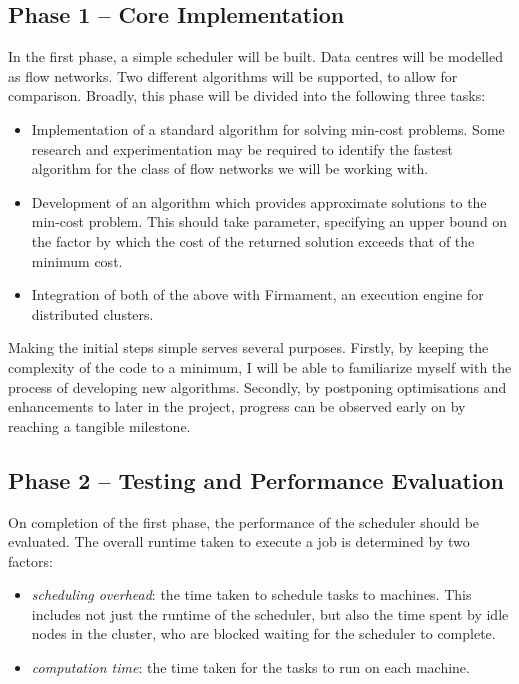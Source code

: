 \subsection*{Phase 1 -- Core Implementation}
\label{subsec:structure-phase1}

In the first phase, a simple scheduler will be built. Data centres will be modelled as flow networks. Two different algorithms will be supported, to allow for comparison. Broadly, this phase will be divided into the following three tasks:
\begin{itemize}
  \item Implementation of a standard algorithm for solving min-cost problems. Some research and experimentation may be required to identify the fastest algorithm for the class of flow networks we will be working with.
  \item Development of an algorithm which provides approximate solutions to the min-cost problem. This should take parameter, specifying an upper bound on the factor by which the cost of the returned solution exceeds that of the minimum cost. 
  \item Integration of both of the above with Firmament, an execution engine for distributed clusters.
\end{itemize}

Making the initial steps simple serves several purposes. Firstly, by keeping the complexity of the code to a minimum, I will be able to familiarize myself with the process of developing new algorithms. Secondly, by postponing optimisations and enhancements to later in the project, progress can be observed early on by reaching a tangible milestone.

\subsection*{Phase 2 -- Testing and Performance Evaluation}
\label{subsec:structure-phase2}


On completion of the first phase, the performance of the scheduler should be evaluated. The overall runtime taken to execute a job is determined by two factors:

\begin{itemize}
  \item \emph{scheduling overhead}: the time taken to schedule tasks to machines. This includes not just the runtime of the scheduler, but also the time spent by idle nodes in the cluster, who are blocked waiting for the scheduler to complete.
  \item \emph{computation time}: the time taken for the tasks to run on each machine.
\end{itemize}

